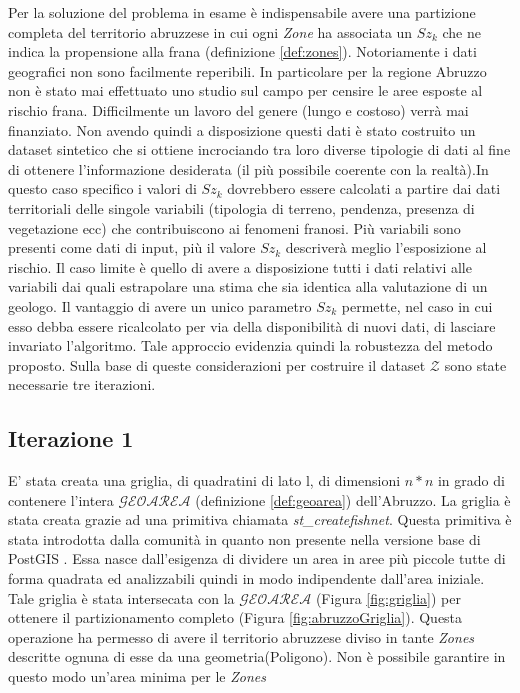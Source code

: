 Per la soluzione del problema in esame è indispensabile avere una partizione completa del territorio abruzzese in cui ogni \textit{Zone} ha associata un $Sz_k$ che ne indica la propensione alla frana (definizione \ref{def:zones}). Notoriamente i dati geografici non sono facilmente reperibili. In particolare per la regione Abruzzo non è stato mai effettuato uno studio sul campo per censire le aree esposte al rischio frana. Difficilmente un lavoro del genere (lungo e costoso) verrà mai finanziato. Non avendo quindi a disposizione questi dati è stato costruito un dataset sintetico che si ottiene incrociando tra loro diverse tipologie di dati al fine di ottenere l'informazione desiderata (il più possibile coerente con la realtà).\newline In questo caso specifico i valori di $Sz_k$ dovrebbero essere calcolati a partire dai dati territoriali delle singole variabili (tipologia di terreno, pendenza, presenza di vegetazione ecc) che contribuiscono ai fenomeni franosi. Più variabili sono presenti come dati di input, più il valore $Sz_k$ descriverà meglio l'esposizione al rischio. Il caso limite è quello di avere a disposizione tutti i dati relativi alle variabili dai quali estrapolare una stima che sia identica alla valutazione di un geologo. Il vantaggio di avere un unico parametro $Sz_k$ permette, nel caso in cui esso debba essere ricalcolato per via della disponibilità di nuovi dati, di lasciare invariato l'algoritmo. Tale approccio evidenzia quindi la robustezza del metodo proposto. Sulla base di queste considerazioni per costruire il dataset $\mathcal{Z}$ sono state necessarie tre iterazioni.

\subsection{\textbf{Iterazione 1}}
E' stata creata una griglia, di quadratini di lato l, di dimensioni $n*n$ in grado di contenere l'intera  $\mathcal{GEOAREA}$ (definizione \ref{def:geoarea}) dell'Abruzzo. La griglia è stata creata grazie ad una primitiva chiamata \textit{st\_createfishnet}. Questa primitiva è stata introdotta dalla comunità in quanto non presente nella versione base di PostGIS \cite{fishnet}. Essa nasce dall'esigenza di dividere un area in aree più piccole tutte di forma quadrata ed analizzabili quindi in modo indipendente dall'area iniziale. Tale griglia è stata intersecata con la  $\mathcal{GEOAREA}$ (Figura \ref{fig:griglia}) per ottenere il partizionamento completo (Figura \ref{fig:abruzzoGriglia}). Questa operazione ha permesso di avere il territorio abruzzese diviso in tante \textit{Zones} descritte ognuna di esse da una geometria(Poligono). Non è possibile garantire in questo modo un'area minima per le \textit{Zones}

